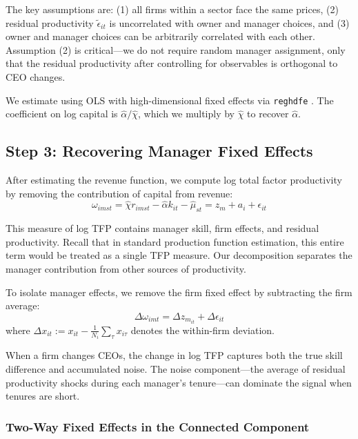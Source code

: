 \documentclass[11pt,a4paper]{article}
\begin{document}
The key assumptions are: (1) all firms within a sector face the same prices, (2) residual productivity $\tilde{\epsilon}_{it}$ is uncorrelated with owner and manager choices, and (3) owner and manager choices can be arbitrarily correlated with each other. Assumption (2) is critical—we do not require random manager assignment, only that the residual productivity after controlling for observables is orthogonal to CEO changes.

We estimate using OLS with high-dimensional fixed effects via \texttt{reghdfe} \citep{reghdfe}. The coefficient on log capital is $\hat{\alpha}/\hat{\chi}$, which we multiply by $\hat{\chi}$ to recover $\hat{\alpha}$.

\subsection{Step 3: Recovering Manager Fixed Effects}

After estimating the revenue function, we compute log total factor productivity by removing the contribution of capital from revenue:
\begin{equation}
\omega_{imst} = \hat{\chi} r_{imst} - \hat{\alpha} k_{it} - \hat{\mu}_{st} = z_m + a_i + \epsilon_{it}
\end{equation}

This measure of log TFP contains manager skill, firm effects, and residual productivity. Recall that in standard production function estimation, this entire term would be treated as a single TFP measure. Our decomposition separates the manager contribution from other sources of productivity.

To isolate manager effects, we remove the firm fixed effect by subtracting the firm average:
\begin{equation}
\Delta\omega_{imt} = \Delta z_{m_{it}} + \Delta\epsilon_{it}
\end{equation}
where $\Delta x_{it} := x_{it} - \frac{1}{N_i}\sum_{\tau} x_{i\tau}$ denotes the within-firm deviation.

When a firm changes CEOs, the change in log TFP captures both the true skill difference and accumulated noise. The noise component—the average of residual productivity shocks during each manager's tenure—can dominate the signal when tenures are short.

\subsubsection{Two-Way Fixed Effects in the Connected Component}
\end{document}
